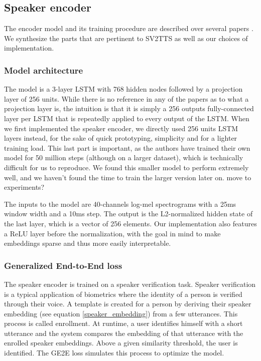 \documentclass[a4paper, oneside, 12pt, english]{article}
\begin{document}
\subsection{Speaker encoder} \label{speaker_encoder}
The encoder model and its training procedure are described over several papers \citep{SV2TTS, GE2E, TE2E}. We synthesize the parts that are pertinent to SV2TTS as well as our choices of implementation.

\subsubsection{Model architecture}
The model is a 3-layer LSTM with 768 hidden nodes followed by a projection layer of 256 units. While there is no reference in any of the papers as to what a projection layer is, the intuition is that it is simply a 256 outputs fully-connected layer per LSTM that is repeatedly applied to every output of the LSTM. When we first implemented the speaker encoder, we directly used 256 units LSTM layers instead, for the sake of quick prototyping, simplicity and for a lighter training load. This last part is important, as the authors have trained their own model for 50 million steps (although on a larger dataset), which is technically difficult for us to reproduce. We found this smaller model to perform extremely well, and we haven't found the time to train the larger version later on. \color{red} move to experiments? \color{black}

The inputs to the model are 40-channels log-mel spectrograms with a 25ms window width and a 10ms step. The output is the L2-normalized hidden state of the last layer, which is a vector of 256 elements. Our implementation also features a ReLU layer before the normalization, with the goal in mind to make embeddings sparse and thus more easily interpretable.

\subsubsection{Generalized End-to-End loss}
The speaker encoder is trained on a speaker verification task. Speaker verification is a typical application of biometrics where the identity of a person is verified through their voice. A template is created for a person by deriving their speaker embedding (see equation \ref{speaker_embedding}) from a few utterances. This process is called enrollment. At runtime, a user identifies himself with a short utterance and the system compares the embedding of that utterance with the enrolled speaker embeddings. Above a given similarity threshold, the user is identified. The GE2E loss simulates this process to optimize the model. 
\end{document}
